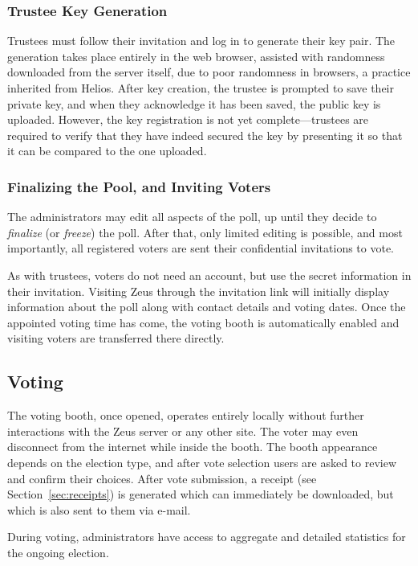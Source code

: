 \documentclass[letterpaper,10pt]{article}
\begin{document}
\subsubsection{Trustee Key Generation}
Trustees must follow their invitation and log in to generate their
key pair. The generation takes place entirely in the web browser,
assisted with randomness downloaded from the server itself, 
due to poor randomness in browsers, a practice inherited from Helios.
After key creation, the trustee is prompted to save their private key,
and when they acknowledge it has been saved, the public key is uploaded.
However, the key registration is not yet complete---trustees are
required to verify that they have indeed secured the key by
presenting it so that it can be compared to the one uploaded.

\subsubsection{Finalizing the Pool, and Inviting Voters}
The administrators may edit all aspects of the poll, up until they
decide to \emph{finalize} (or \emph{freeze}) the poll.
After that, only limited editing is possible, and most importantly,
all registered voters are sent their confidential invitations to vote.

As with trustees, voters do not need an account, but use the secret
information in their invitation.
Visiting Zeus through the invitation link will initially display
information about the poll along with contact details and voting dates.
Once the appointed voting time has come, the voting booth is
automatically enabled and visiting voters are transferred there directly.

\subsection{Voting}
The voting booth, once opened, operates entirely locally without
further interactions with the Zeus server or any other site.
The voter may even disconnect from the internet while inside the booth.
The booth appearance depends on the election type, and after vote
selection users are asked to review and confirm their choices.
After vote submission, a receipt (see Section~\ref{sec:receipts}) is
generated which can immediately be downloaded, but which is also sent
to them via e-mail.

During voting, administrators have access to aggregate and detailed
statistics for the ongoing election.
\end{document}
